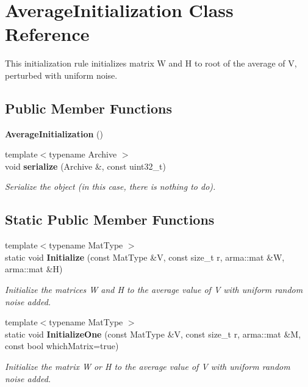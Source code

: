 \section{Average\+Initialization Class Reference}
\label{classmlpack_1_1amf_1_1AverageInitialization}


This initialization rule initializes matrix W and H to root of the average of V, perturbed with uniform noise.  


\subsection*{Public Member Functions}
\begin{DoxyCompactItemize}
\item 
\textbf{ Average\+Initialization} ()
\item 
{\footnotesize template$<$typename Archive $>$ }\\void \textbf{ serialize} (Archive \&, const uint32\+\_\+t)
\begin{DoxyCompactList}\small\item\em Serialize the object (in this case, there is nothing to do). \end{DoxyCompactList}\end{DoxyCompactItemize}
\subsection*{Static Public Member Functions}
\begin{DoxyCompactItemize}
\item 
{\footnotesize template$<$typename Mat\+Type $>$ }\\static void \textbf{ Initialize} (const Mat\+Type \&V, const size\+\_\+t r, arma\+::mat \&W, arma\+::mat \&H)
\begin{DoxyCompactList}\small\item\em Initialize the matrices W and H to the average value of V with uniform random noise added. \end{DoxyCompactList}\item 
{\footnotesize template$<$typename Mat\+Type $>$ }\\static void \textbf{ Initialize\+One} (const Mat\+Type \&V, const size\+\_\+t r, arma\+::mat \&M, const bool which\+Matrix=true)
\begin{DoxyCompactList}\small\item\em Initialize the matrix W or H to the average value of V with uniform random noise added. \end{DoxyCompactList}\end{DoxyCompactItemize}


